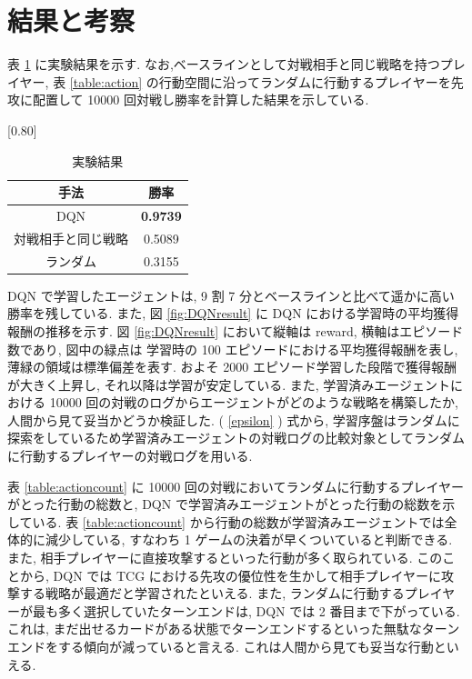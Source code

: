 \documentclass[twocolumn]{jarticle}
\begin{document}
\section{結果と考察}
表 \ref{table:result} に実験結果を示す. なお,ベースラインとして対戦相手と同じ戦略を持つプレイヤー, 表 \ref{table:action} の行動空間に沿ってランダムに行動するプレイヤーを先攻に配置して 10000 回対戦し勝率を計算した結果を示している.\par 
\begin{table}[t]
  \centering
  \caption{実験結果}
  \vspace{-0.3cm}
  \label{table:result}
  \scalebox{0.80}[0.80]{
    \begin{tabular}{|c|c|}
      \hline
      手法 & 勝率 \\ \hline \hline
      DQN & \textbf{0.9739} \\ \hline
      対戦相手と同じ戦略 & 0.5089 \\ \hline     
      ランダム & 0.3155 \\ \hline

      \end{tabular}
  }
  \end{table}
  DQN で学習したエージェントは, 9 割 7 分とベースラインと比べて遥かに高い勝率を残している. また,  図 \ref{fig:DQNresult} に DQN における学習時の平均獲得報酬の推移を示す. 図 \ref{fig:DQNresult}  において縦軸は reward, 横軸はエピソード数であり, 図中の緑点は 学習時の 100 エピソードにおける平均獲得報酬を表し, 薄緑の領域は標準偏差を表す.
  およそ 2000 エピソード学習した段階で獲得報酬が大きく上昇し, それ以降は学習が安定している. 
  また, 学習済みエージェントにおける 10000 回の対戦のログからエージェントがどのような戦略を構築したか, 人間から見て妥当かどうか検証した.  ( \ref{epsilon} ) 式から, 学習序盤はランダムに探索をしているため学習済みエージェントの対戦ログの比較対象としてランダムに行動するプレイヤーの対戦ログを用いる.
  \par
  表 \ref{table:actioncount} に 10000 回の対戦においてランダムに行動するプレイヤーがとった行動の総数と, DQN で学習済みエージェントがとった行動の総数を示している. 
  表 \ref{table:actioncount} から行動の総数が学習済みエージェントでは全体的に減少している, すなわち 1 ゲームの決着が早くついていると判断できる. また, 相手プレイヤーに直接攻撃するといった行動が多く取られている. このことから, DQN では TCG における先攻の優位性を生かして相手プレイヤーに攻撃する戦略が最適だと学習されたといえる. 
  また, ランダムに行動するプレイヤーが最も多く選択していたターンエンドは, DQN では 2 番目まで下がっている. これは, まだ出せるカードがある状態でターンエンドするといった無駄なターンエンドをする傾向が減っていると言える. これは人間から見ても妥当な行動といえる.\par
\end{document}
